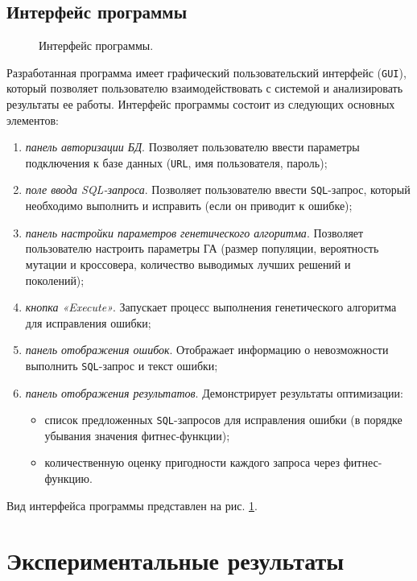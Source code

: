 \documentclass[master,paper]{pmk-graduate}
\begin{document}
\section{Интерфейс программы}
\label{sec24}

\begin{figure}
	\centering
	\caption{Интерфейс программы.}
	\label{fig1}
\end{figure}
Разработанная программа имеет графический пользовательский интерфейс (\texttt{GUI}), который позволяет пользователю взаимодействовать с системой и анализировать результаты ее работы.
Интерфейс программы состоит из следующих основных элементов:
\begin{enumerate}
\item \textit{панель авторизации БД}. Позволяет пользователю ввести параметры подключения к базе данных (\texttt{URL}, имя пользователя, пароль);
\item \textit{поле ввода {SQL}-запроса}. Позволяет пользователю ввести \texttt{SQL}-запрос, который необходимо выполнить и исправить (если он приводит к ошибке);
\item \textit{панель настройки параметров генетического алгоритма}. Позволяет пользователю настроить параметры ГА (размер популяции, вероятность мутации и кроссовера, количество выводимых лучших решений и поколений);
\item \textit{кнопка «Execute»}. Запускает процесс выполнения генетического алгоритма для исправления ошибки;
\item \textit{панель отображения ошибок}. Отображает информацию о невозможности выполнить \texttt{SQL}-запрос и текст ошибки;
\item \textit{панель отображения результатов}. Демонстрирует результаты оптимизации:
\begin{itemize}
\item список предложенных \texttt{SQL}-запросов для исправления ошибки (в порядке убывания значения фитнес-функции);
\item количественную оценку пригодности каждого запроса через фитнес-функцию.
\end{itemize}
\end{enumerate}
Вид интерфейса программы представлен на рис. \ref{fig1}.


\chapter{Экспериментальные результаты}
\label{chap3}
\end{document}
